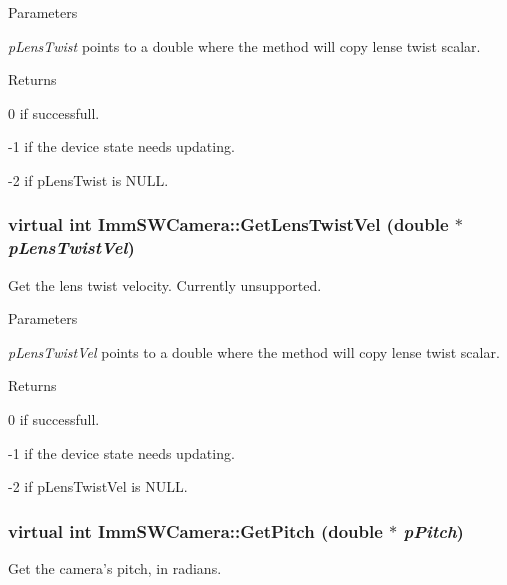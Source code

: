 \begin{DoxyParams}{Parameters}
\item[{\em pLensTwist}]points to a double where the method will copy lense twist scalar.\end{DoxyParams}
\begin{DoxyReturn}{Returns}

\end{DoxyReturn}
0 if successfull.

-\/1 if the device state needs updating.

-\/2 if pLensTwist is NULL. \hypertarget{classImmSWCamera_afadaf1d765231255f15a5d28994c5f8b}{
\subsubsection[{GetLensTwistVel}]{\setlength{\rightskip}{0pt plus 5cm}virtual int ImmSWCamera::GetLensTwistVel (double $\ast$ {\em pLensTwistVel})}}
\label{classImmSWCamera_afadaf1d765231255f15a5d28994c5f8b}
Get the lens twist velocity. Currently unsupported.


\begin{DoxyParams}{Parameters}
\item[{\em pLensTwistVel}]points to a double where the method will copy lense twist scalar.\end{DoxyParams}
\begin{DoxyReturn}{Returns}

\end{DoxyReturn}
0 if successfull.

-\/1 if the device state needs updating.

-\/2 if pLensTwistVel is NULL. \hypertarget{classImmSWCamera_a2d38c7834c0216d448f248a6f356274d}{
\subsubsection[{GetPitch}]{\setlength{\rightskip}{0pt plus 5cm}virtual int ImmSWCamera::GetPitch (double $\ast$ {\em pPitch})}}
\label{classImmSWCamera_a2d38c7834c0216d448f248a6f356274d}
Get the camera's pitch, in radians.


